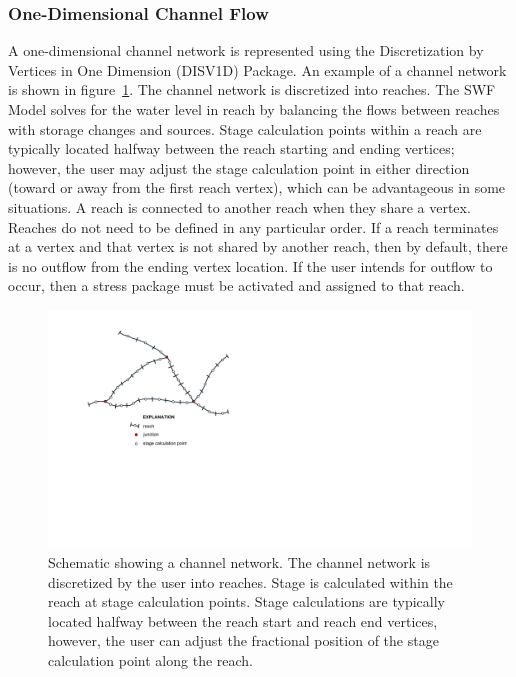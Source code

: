 \documentclass[fleqn]{article}
\begin{document}
\subsubsection{One-Dimensional Channel Flow}
A one-dimensional channel network is represented using the Discretization by Vertices in One Dimension (DISV1D) Package.  An example of a channel network is shown in figure~\ref{fig:channel_network}.  The channel network is discretized into reaches.  The SWF Model solves for the water level in reach by balancing the flows between reaches with storage changes and sources.  Stage calculation points within a reach are typically located halfway between the reach starting and ending vertices; however, the user may adjust the stage calculation point in either direction (toward or away from the first reach vertex), which can be advantageous in some situations.  A reach is connected to another reach when they share a vertex.  Reaches do not need to be defined in any particular order.  If a reach terminates at a vertex and that vertex is not shared by another reach, then by default, there is no outflow from the ending vertex location.  If the user intends for outflow to occur, then a stress package must be activated and assigned to that reach.

\begin{figure}
  \centering
  \includegraphics[scale=0.9]{figures/channel_network.pdf}
  \caption[Schematic showing a channel network.]{Schematic showing a channel network.  The channel network is discretized by the user into reaches.  Stage is calculated within the reach at stage calculation points.  Stage calculations are typically located halfway between the reach start and reach end vertices, however, the user can adjust the fractional position of the stage calculation point along the reach.}
  \label{fig:channel_network}
\end{figure}
  
\end{document}
